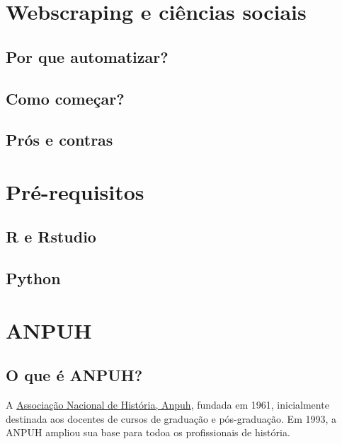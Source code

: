 \documentclass[
]{book}
\begin{document}
\hypertarget{webscraping-e-ciuxeancias-sociais}{%
\chapter{Webscraping e ciências sociais}\label{webscraping-e-ciuxeancias-sociais}}

\hypertarget{por-que-automatizar}{%
\section{Por que automatizar?}\label{por-que-automatizar}}

\hypertarget{como-comeuxe7ar}{%
\section{Como começar?}\label{como-comeuxe7ar}}

\hypertarget{pruxf3s-e-contras}{%
\section{Prós e contras}\label{pruxf3s-e-contras}}

\hypertarget{pruxe9-requisitos}{%
\chapter{Pré-requisitos}\label{pruxe9-requisitos}}

\hypertarget{r-e-rstudio}{%
\section{R e Rstudio}\label{r-e-rstudio}}

\hypertarget{python}{%
\section{Python}\label{python}}

\hypertarget{anpuh}{%
\chapter{ANPUH}\label{anpuh}}

\hypertarget{o-que-uxe9-anpuh}{%
\section{O que é ANPUH?}\label{o-que-uxe9-anpuh}}

A \href{https://anpuh.org.br/index.php}{Associação Nacional de História, Anpuh}, fundada em 1961, inicialmente destinada aos docentes de cursos de graduação e pós-graduação. Em 1993, a ANPUH ampliou sua base para todoa os profissionais de história.
\end{document}
